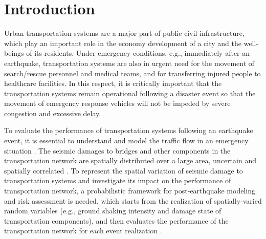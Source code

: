 \documentclass[review,11pt,nonatbib]{elsarticle}
\begin{document}
\section{Introduction}
Urban transportation systems are a major part of public civil infrastructure, which play an important role in the economy development of a city and the well-beings of its residents. Under emergency conditions, e.g., immediately after an earthquake, transportation systems are also in urgent need for the movement of search/rescue personnel and medical teams, and for transferring injured people to healthcare facilities. In this respect, it is critically important that the transportation systems remain operational following a disaster event so that the movement of emergency response vehicles will not be impeded by severe congestion and excessive delay.
\par To evaluate the performance of transportation systems following an earthquake event, it is essential to understand and model the traffic flow in an emergency situation \citep{brodsky1990emergency,jacques2014resilience,miller2016coupling}. The seismic damages to bridges and other components in the transportation network are spatially distributed over a large area, uncertain and spatially correlated \citep{Han2012Probabilistic}. To represent the spatial variation of seismic damage to transportation systems and investigate its impact on the performance of transportation network, a probabilistic framework for post-earthquake modeling and risk assessment is needed, which starts from the realization of spatially-varied random variables (e.g., ground shaking intensity and damage state of transportation components), and then evaluates the performance of the transportation network for each event realization \citep{Grossi2005Catastrophe,Han2012Probabilistic,Miller2015Estimating}. 
\end{document}
